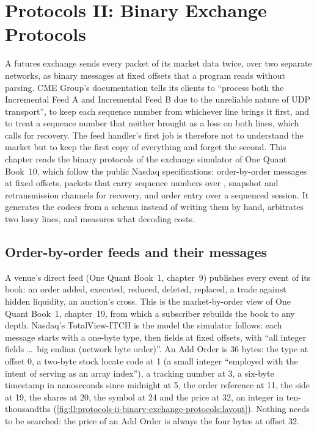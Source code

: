\chapter{Protocols II: Binary Exchange Protocols}\label{ch:ll:protocols-ii-binary-exchange-protocols}

A futures exchange sends every packet of its market data twice, over two separate networks, as binary messages at fixed
offsets that a program reads without parsing. CME Group's documentation tells its clients to ``process both the Incremental
Feed A and Incremental Feed B due to the unreliable nature of UDP transport'', to keep each sequence number from whichever
line brings it first, and to treat a sequence number that neither brought as a loss on both lines, which calls for
recovery. The feed handler's first job is therefore not to understand the market but to keep the first copy of everything
and forget the second. This chapter reads the binary protocols of the exchange simulator of One Quant Book~10, which follow
the public Nasdaq specifications: order-by-order messages at fixed offsets, packets that carry sequence numbers over
, snapshot and retransmission channels for recovery, and order entry over a sequenced session. It generates the
codecs from a schema instead of writing them by hand, arbitrates two lossy lines, and measures what decoding costs.

\section{Order-by-order feeds and their messages}

A venue's direct feed (One Quant Book~1, chapter~9) publishes every event of its book: an order added, executed, reduced,
deleted, replaced, a trade against hidden liquidity, an auction's cross. This is the market-by-order view of One Quant
Book~1, chapter~19, from which a subscriber rebuilds the book to any depth. Nasdaq's TotalView-ITCH is the model the
simulator follows: each message starts with a one-byte type, then fields at fixed offsets, with ``all integer fields \dots\
big endian (network byte order)''. An Add Order is 36 bytes: the type at offset 0, a two-byte stock locate code at 1 (a small
integer ``employed with the intent of serving as an array index''), a tracking number at 3, a six-byte timestamp in
nanoseconds since midnight at 5, the order reference at 11, the side at 19, the shares at 20, the symbol at 24 and the price
at 32, an integer in ten-thousandths (\cref{fig:ll:protocols-ii-binary-exchange-protocols:layout}). Nothing needs to be
searched: the price of an Add Order is always the four bytes at offset 32.

